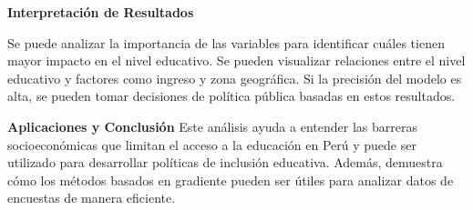 \documentclass{article}
\begin{document}
	\textbf{Interpretación de Resultados}
	
	Se puede analizar la importancia de las variables para identificar cuáles tienen mayor impacto en el nivel educativo. Se pueden visualizar relaciones entre el nivel educativo y factores como ingreso y zona geográfica. Si la precisión del modelo es alta, se pueden tomar decisiones de política pública basadas en estos resultados.
	
	\textbf{Aplicaciones y Conclusión}
	Este análisis ayuda a entender las barreras socioeconómicas que limitan el acceso a la educación en Perú y puede ser utilizado para desarrollar políticas de inclusión educativa. Además, demuestra cómo los métodos basados en gradiente pueden ser útiles para analizar datos de encuestas de manera eficiente.
	
	
\end{document}
